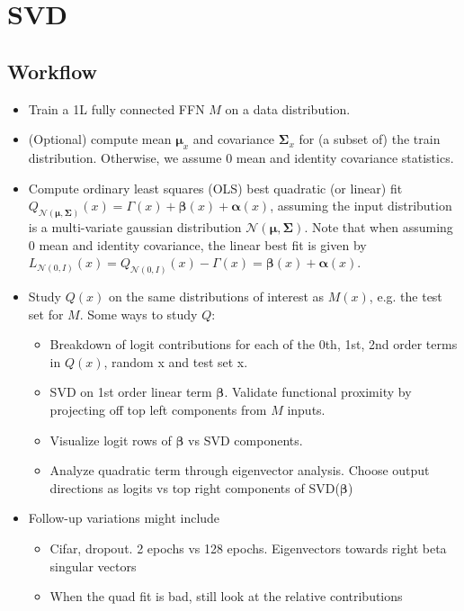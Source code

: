 \documentclass{article}
\theoremstyle{plain}
\theoremstyle{definition}
\theoremstyle{remark}
\newcommand{\aalpha}{\boldsymbol{\alpha}}
\newcommand{\bbeta}{\boldsymbol{\beta}}
\newcommand{\mmu}{\boldsymbol{\mu}}
\newcommand{\SSigma}{\boldsymbol{\Sigma}}
\begin{document}
\newpage
\section{SVD}
\subsection{Workflow}
\begin{itemize}
\item Train a 1L fully connected FFN $M$ on a data distribution.
\item (Optional) compute mean $\mmu_x$ and covariance $\SSigma_x$ for (a subset of) the train distribution. Otherwise, we assume $0$ mean and identity covariance statistics.
\item Compute ordinary least squares (OLS) best quadratic (or linear) fit $Q_{\mathcal{N}(\mmu, \SSigma)}(x)=\Gamma(x)+\bbeta(x)+\aalpha(x)$, assuming the input distribution is a multi-variate gaussian distribution $\mathcal{N}(\mmu, \SSigma)$. Note that when assuming 0 mean and identity covariance, the linear best fit is given by $L_{\mathcal{N}(0,I)}(x)=Q_{\mathcal{N}(0, I)}(x)-\Gamma(x)=\bbeta(x)+\aalpha(x)$.
\item Study $Q(x)$ on the same distributions of interest as $M(x)$, e.g. the test set for $M$. Some ways to study $Q$:
\begin{itemize}
\item Breakdown of logit contributions for each of the 0th, 1st, 2nd order terms in $Q(x)$, random x and test set x.
\item SVD on 1st order linear term $\bbeta$. Validate functional proximity by projecting off top left components from $M$ inputs.
\item Visualize logit rows of $\bbeta$ vs SVD components.
\item Analyze quadratic term through eigenvector analysis. Choose output directions as logits vs top right components of SVD($\bbeta$)
\end{itemize}
\item Follow-up variations might include
\begin{itemize}
\item Cifar, dropout. 2 epochs vs 128 epochs. Eigenvectors towards right beta singular vectors
\item When the quad fit is bad, still look at the relative contributions
\end{itemize}
\end{itemize}
\end{document}
